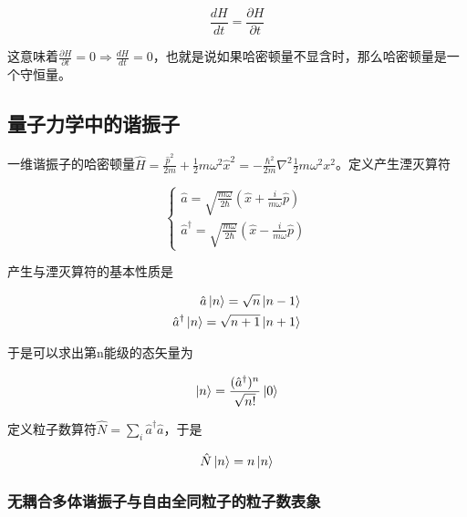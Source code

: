 \begin{equation}
    \frac{d H}{dt}=\frac{\partial H}{\partial t}
\end{equation}

这意味着$\frac{\partial H}{\partial t}=0\Rightarrow\frac{dH}{dt}=0$，也就是说如果哈密顿量不显含时，那么哈密顿量是一个守恒量。



\subsection{量子力学中的谐振子}

一维谐振子的哈密顿量$\hat{H}=\frac{\hat{p}^2}{2m}+\frac{1}{2}m\omega^2\hat{x}^2=-\frac{\hbar^2}{2m}\nabla^2\frac{1}{2}m\omega^2x^2$。定义产生湮灭算符

\begin{equation}
    \left\{
        \begin{array}{lr}
            \hat{a}=\sqrt{\frac{m\omega}{2\hbar}}(\hat{x}+\frac{i}{m\omega}\hat{p})   \\
            \hat{a}^\dagger=\sqrt{\frac{m\omega}{2\hbar}}(\hat{x}-\frac{i}{m\omega}\hat{p})
        \end{array}
    \right.
\end{equation}

产生与湮灭算符的基本性质是

\begin{equation}
    \begin{split}
        \hat{a}\ket{n}=\sqrt{n}\ket{n-1} \\
        \hat{a}^\dagger\ket{n}=\sqrt{n+1}\ket{n+1}
    \end{split}
\end{equation}

于是可以求出第n能级的态矢量为

\begin{equation}
    \ket{n}=\frac{(\hat{a}^\dagger)^n}{\sqrt{n!}}\ket{0}
\end{equation}

定义粒子数算符$\hat{N}=\sum_{i}\hat{a}^\dagger\hat{a}$，于是

\begin{equation}
    \hat{N}\ket{n}=n\ket{n}
\end{equation}

\subsubsection{无耦合多体谐振子与自由全同粒子的粒子数表象}

